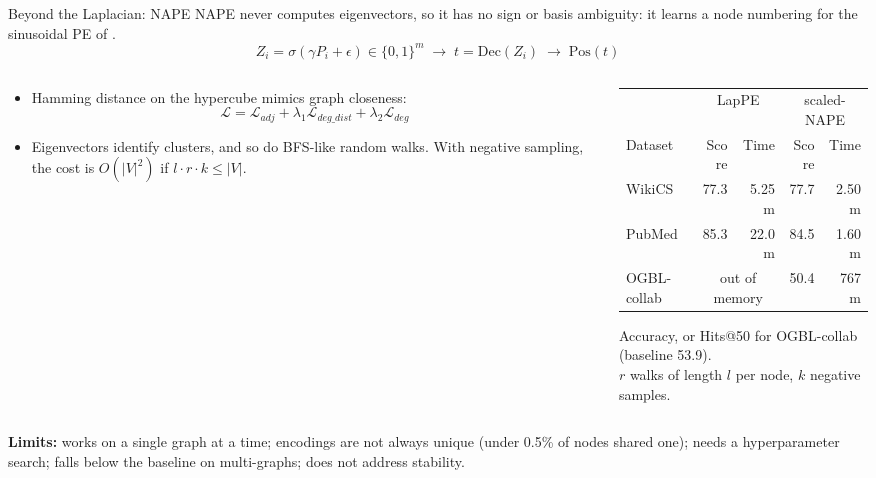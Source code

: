 \documentclass[aspectratio=169,11pt]{beamer}
\begin{document}
\begin{frame}{Beyond the Laplacian: NAPE}
  \small
  NAPE \citep{ajayi2024nape} \alert{never computes eigenvectors}, so it has no
  sign or basis ambiguity: it learns a node numbering for the sinusoidal PE of
  \citet{vaswani2017attention}.
  \begin{equation*}
    Z_i = \sigma(\gamma P_i + \epsilon) \in \{0,1\}^m
    \;\longrightarrow\; t = \mathrm{Dec}(Z_i)
    \;\longrightarrow\; \mathrm{Pos}(t)
  \end{equation*}
  \begin{columns}[T]
    \begin{column}{0.47\textwidth}
      \begin{itemize}
        \item Hamming distance on the hypercube mimics graph closeness:
              \begin{equation*}
                \mathcal{L} = \mathcal{L}_{adj}
                + \lambda_1 \mathcal{L}_{deg\_dist}
                + \lambda_2 \mathcal{L}_{deg}
              \end{equation*}
        \item Eigenvectors identify clusters, and so do BFS-like
              \alert{random walks}. With negative sampling, the cost is
              $O(|V|^2)$ if $l \cdot r \cdot k \leq |V|$.
      \end{itemize}
    \end{column}
    \begin{column}{0.49\textwidth}
      \centering
      \footnotesize
      \setlength{\tabcolsep}{3pt}
      \begin{tabular}{lrrrr}
        \toprule
        & \multicolumn{2}{c}{LapPE} & \multicolumn{2}{c}{scaled-NAPE} \\
        Dataset & Score & Time & Score & Time \\
        \midrule
        WikiCS       & 77.3 & 5.25 m & 77.7 & 2.50 m \\
        PubMed       & 85.3 & 22.0 m & 84.5 & 1.60 m \\
        OGBL-collab  & \multicolumn{2}{c}{out of memory} & 50.4 & 767 m \\
        \bottomrule
      \end{tabular}

      \smallskip
      \scriptsize Accuracy, or Hits@50 for OGBL-collab (baseline 53.9).\\
      $r$ walks of length $l$ per node, $k$ negative samples.
    \end{column}
  \end{columns}

  \medskip
  \textbf{Limits:} works on \alert{a single graph} at a time; encodings are not
  always unique (under 0.5\% of nodes shared one); needs a hyperparameter search;
  falls below the baseline on multi-graphs; does not address stability.
\end{frame}
\end{document}
